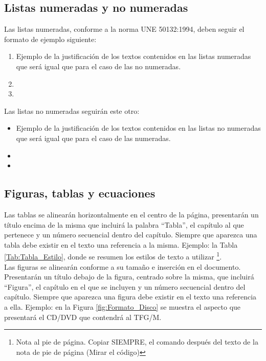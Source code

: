 \subsection{Listas numeradas y no numeradas}
Las listas numeradas, conforme a la norma UNE 50132:1994, deben seguir el formato de ejemplo siguiente:

\begin{enumerate}[label*=\arabic*]
	\item Ejemplo de la justificación de los textos contenidos en las listas numeradas que será igual que para el caso de las no numeradas.
	\item
	\item
\end{enumerate}

Las listas no numeradas seguirán este otro:

\begin{itemize}
	\item Ejemplo de la justificación de los textos contenidos en las listas no numeradas que será igual que para el caso de las numeradas.
	\item
	\item
\end{itemize}

\subsection{	Figuras, tablas y ecuaciones}
Las tablas se alinearán horizontalmente en el centro de la página, presentarán un título encima de la misma que incluirá la palabra “Tabla”, el capítulo al que pertenece y un número secuencial dentro del capítulo. Siempre que aparezca una tabla debe existir en el texto una referencia a la misma. Ejemplo: la Tabla \ref{Tab:Tabla_Estilo}, donde se resumen los estilos de texto a utilizar \footnote{Nota al pie de página. Copiar SIEMPRE,  el comando después del texto de la nota de pie de página (Mirar el código)}.\\

Las figuras se alinearán conforme a su tamaño e inserción en el documento. Presentarán un título debajo de la figura, centrado sobre la misma, que incluirá “Figura”, el capítulo en el que se incluyen y un número secuencial dentro del capítulo. Siempre que aparezca una figura debe existir en el texto una referencia a ella. Ejemplo: en la Figura \ref{fig:Formato_Disco} se muestra el aspecto que presentará el CD/DVD que contendrá al TFG/M.\\
\newpage

